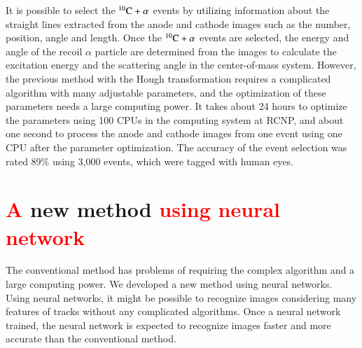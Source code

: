 \documentclass{jps-cp}
\begin{document}
It is possible to select the ${}^{10}\rm{C}+\alpha$ events by
utilizing information about the straight lines extracted from the anode and cathode images such as
the number, position, angle and length.
Once the ${}^{10}\rm{C}+\alpha$ events are selected, the energy and angle of the recoil $\alpha$ particle
are determined from the images to calculate the excitation energy and the scattering angle in the center-of-mass system.
However, the previous method with the Hough transformation requires a complicated algorithm with many adjustable parameters,
and the optimization of these parameters needs a large computing power.
It takes about 24 hours to optimize the parameters using 100 CPUs
in the computing system at RCNP, 
and about one second to process the anode and cathode images from one event using one CPU after the parameter optimization.
The accuracy of the event selection was rated 89\% using 3,000 events,
which were tagged with human eyes.

\section{\textcolor{red}{A} new method \textcolor{red}{using neural network}}
The conventional method has problems of requiring the complex algorithm and a large computing power.
We developed a new method using neural networks.
Using neural networks, it might be possible to recognize images
considering many features of tracks without any complicated algorithms.
Once a neural network trained, the neural network is expected to recognize images faster and more accurate than the conventional method.

\end{document}
